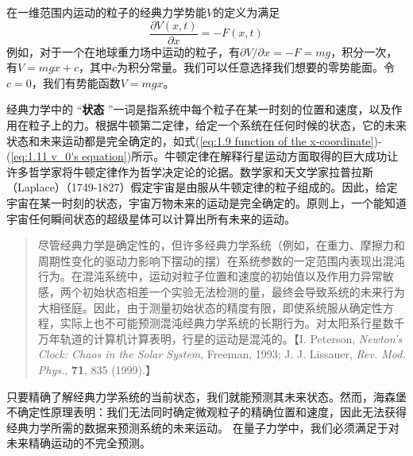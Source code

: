 	在一维范围内运动的粒子的经典力学势能$V$的定义为满足
	\begin{equation}
	 	\boxed{\frac{\partial V \left(x,t\right)}{\partial x} = -F\left(x,t\right)}
	 	\label{eq:1.12 Potential energy in classical mechanics}
	\end{equation}
	例如，对于一个在地球重力场中运动的粒子，有$\partial V / \partial x = -F = mg$，积分一次，有$V = mgx+c$，其中$c$为积分常量。我们可以任意选择我们想要的零势能面。令$c=0$，我们有势能函数$V=mgx$。

	经典力学中的 “\textbf{状态} ”一词是指系统中每个粒子在某一时刻的位置和速度，以及作用在粒子上的力。根据牛顿第二定律，给定一个系统在任何时候的状态，它的未来状态和未来运动都是完全确定的，如式(\ref{eq:1.9 function of the x-coordinate})-(\ref{eq:1.11 v_0's equation})所示。牛顿定律在解释行星运动方面取得的巨大成功让许多哲学家将牛顿定律作为哲学决定论的论据。数学家和天文学家拉普拉斯（Laplace）（1749-1827）假定宇宙是由服从牛顿定律的粒子组成的。因此，给定宇宙在某一时刻的状态，宇宙万物未来的运动是完全确定的。原则上，一个能知道宇宙任何瞬间状态的超级星体可以计算出所有未来的运动。
	\begin{quote}
		\small %
		\noindent %
		尽管经典力学是确定性的，但许多经典力学系统（例如，在重力、摩擦力和周期性变化的驱动力影响下摆动的摆）在系统参数的一定范围内表现出混沌行为。在混沌系统中，运动对粒子位置和速度的初始值以及作用力异常敏感，两个初始状态相差一个实验无法检测的量，最终会导致系统的未来行为大相径庭。因此，由于测量初始状态的精度有限，即使系统服从确定性方程，实际上也不可能预测混沌经典力学系统的长期行为。对太阳系行星数千万年轨道的计算机计算表明，行星的运动是混沌的。【I. Peterson, \textit{Newton’s Clock: Chaos in the Solar System}, Freeman, 1993; J. J. Lissauer, \textit{Rev. Mod. Phys.}, \textbf{71}, 835 (1999).】
	\end{quote}
	 
	只要精确了解经典力学系统的当前状态，我们就能预测其未来状态。然而，海森堡不确定性原理表明：我们无法同时确定微观粒子的精确位置和速度，因此无法获得经典力学所需的数据来预测系统的未来运动。 在量子力学中，我们必须满足于对未来精确运动的不完全预测。

